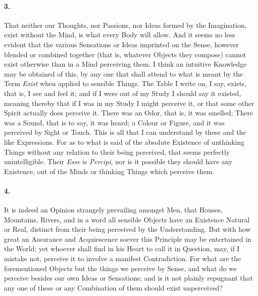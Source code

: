 \documentclass[]{article}
\newenvironment{sectionbody}{}{}
\begin{document}
\begin{sectionbody}
\paragraph{3.} That neither our Thoughts, nor Passions, nor Ideas formed by the
Imagination, exist without the Mind, is what every Body will
allow.  And it seems no less evident that the various Sensations
or Ideas imprinted on the Sense, however blended or combined
together (that is, whatever Objects they compose) cannot exist
otherwise than in a Mind perceiving them.  I think an intuitive
Knowledge may be obtained of this, by any one that shall attend
to what is meant by the Term \emph{Exist} when applied to
sensible Things.  The Table I write on, I say, exists, that is, I
see and feel it; and if I were out of my Study I should say it
existed, meaning thereby that if I was in my Study I might
perceive it, or that some other Spirit actually does perceive it.
There was an Odor, that is, it was smelled; There was a Sound,
that is to say, it was heard; a Colour or Figure, and it was
perceived by Sight or Touch.  This is all that I can understand
by these and the like Expressions.  For as to what is said of the
absolute Existence of unthinking Things without any relation to
their being perceived, that seems perfectly unintelligible.
Their \emph{Esse} is \emph{Percipi}, nor is it possible they
should have any Existence, out of the Minds or thinking Things
which perceive them.



\paragraph{4.} It is indeed an Opinion strangely prevailing amongst Men, that
Houses, Mountains, Rivers, and in a word all sensible Objects
have an Existence Natural or Real, distinct from their being
perceived by the Understanding.  But with how great an Assurance
and Acquiescence soever this Principle may be entertained in the
World; yet whoever shall find in his Heart to call it in
Question, may, if I mistake not, perceive it to involve a
manifest Contradiction.  For what are the forementioned Objects
but the things we perceive by Sense, and what do we perceive
besides our own Ideas or Sensations; and is it not plainly
repugnant that any one of these or any Combination of them should
exist unperceived?




\end{sectionbody}
\end{document}

